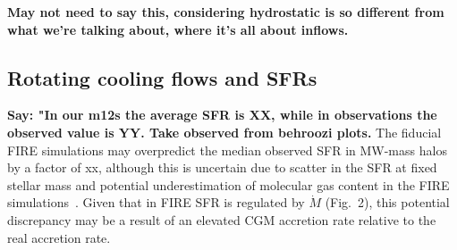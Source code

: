 \documentclass[fleqn,usenatbib]{mnras}
\newcommand{\Mdot}{\dot{M}}
\begin{document}
\textbf{May not need to say this, considering hydrostatic is so different from what we're talking about, where it's all about inflows.}

\subsection{Rotating cooling flows and SFRs}
\label{s: fueling}


\textbf{Say: "In our m12s the average SFR is XX, while in observations the observed value is YY. Take observed from behroozi plots.}
The fiducial FIRE simulations may overpredict the median observed SFR in MW-mass halos by a factor of xx, although this is uncertain due to scatter in the SFR at fixed stellar mass and potential underestimation of molecular gas content in the FIRE simulations~\citep{Sparre2017, Orr2018}.
Given that in FIRE SFR is regulated by $\Mdot$ (Fig.~2), this potential discrepancy may be a result of an elevated CGM accretion rate relative to the real accretion rate.
\end{document}
